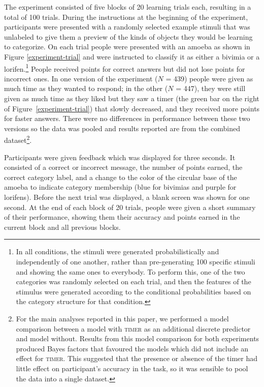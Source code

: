 \documentclass[a4paper, doc, floatsintext]{apa6}
\begin{document}
The experiment consisted of five blocks of 20 learning trials each, resulting in a total of 100 trials. During the instructions at the beginning of the experiment, participants were presented with a randomly selected example stimuli that was unlabeled to give them a preview of the kinds of objects they would be learning to categorize. On each trial people were presented with an amoeba as shown in Figure \ref{experiment-trial} and were instructed to classify it as either a \textsf{bivimia} or a \textsf{lorifen}.\footnote{In all conditions, the stimuli were generated probabilistically and independently of one another, rather than pre-generating 100 specific stimuli and showing the same ones to everybody. To perform this, one of the two categories was randomly selected on each trial, and then the features of the stimulus were generated according to the conditional probabilities based on the category structure for that condition.} People received points for correct answers but did not lose points for incorrect ones. In one version of the experiment ($N$ = 439) people were given as much time as they wanted to respond; in the other ($N$ = 447), they were still given as much time as they liked but they saw a timer (the green bar on the right of Figure~\ref{experiment-trial}) that slowly decreased, and they received more points for faster answers. There were no differences in performance between these two versions so the data was pooled and results reported are from the combined dataset\footnote{For the main analyses reported in this paper, we performed a model comparison between a model with \textsc{timer} as an additional discrete predictor and model without. Results from this model comparison for both experiments produced Bayes factors that favoured the models which did not include an effect for \textsc{timer}. This suggested that the presence or absence of the timer had little effect on participant's accuracy in the task, so it was sensible to pool the data into a single dataset.}.

Participants were given feedback which was displayed for three seconds. It consisted of a \textsf{correct} or \textsf{incorrect} message, the number of points earned, the correct category label, and a change to the color of the circular base of the amoeba to indicate category membership (blue for \textsf{bivimias} and purple for \textsf{lorifens}). Before the next trial was displayed, a blank screen was shown for one second. At the end of each block of 20 trials, people were given a short summary of their performance, showing them their accuracy and points earned in the current block and all previous blocks.
\end{document}

